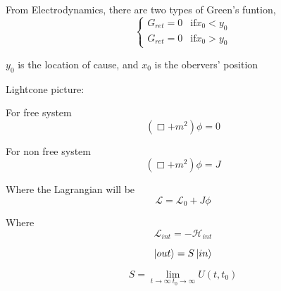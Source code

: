 \documentclass[12pt, letterpaper]{article}
\newcommand*{\1}{\hspace{1pt}}
\begin{document}
    From Electrodynamics, there are two types of Green's funtion,
    \begin{equation}
        \begin{cases}
            G_{ret} = 0 & \text {if} x_{0} < y_{0} \\
            G_{ret} = 0 & \text {if} x_{0} > y_{0}
        \end{cases}
    \end{equation}
    
    $y_{0}$ is the location of cause, and $x_{0}$ is the obervers' position

    Lightcone picture:

    For free system
    \begin{equation}
        (\Box + m^{2}) \phi = 0
    \end{equation}

    For non free system
    \begin{equation}
        (\Box + m^{2}) \phi = J
    \end{equation}

    Where the Lagrangian will be
    \begin{equation}
        \mathcal{L}  = \mathcal{L} _{0} +J\phi
    \end{equation}
    
    Where
    \begin{equation}
        \mathcal{L} _{int}  = -\mathcal{H} _{int} 
    \end{equation}

    \begin{equation}
        \ket {out} = S \ket{in}
    \end{equation}

    \begin{equation}
        S = \lim_{t \to \infty \ t_{0} \to \infty} U(t,t_{0})  
    \end{equation}
    
\end{document}
